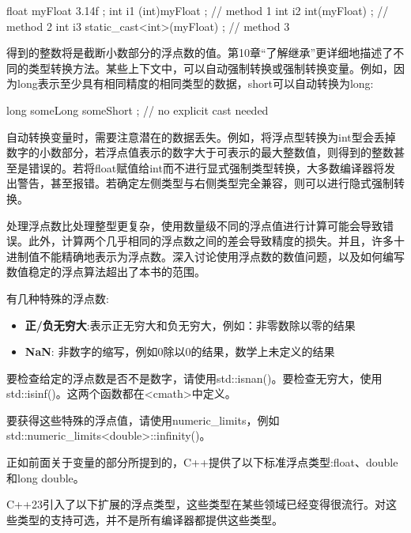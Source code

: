 \begin{cpp}
float myFloat { 3.14f };
int i1 { (int)myFloat }; // method 1
int i2 { int(myFloat) }; // method 2
int i3 { static_cast<int>(myFloat) }; // method 3
\end{cpp}

得到的整数将是截断小数部分的浮点数的值。第10章“了解继承”更详细地描述了不同的类型转换方法。某些上下文中，可以自动强制转换或强制转换变量。例如，因为long表示至少具有相同精度的相同类型的数据，short可以自动转换为long:

\begin{cpp}
long someLong { someShort }; // no explicit cast needed
\end{cpp}

自动转换变量时，需要注意潜在的数据丢失。例如，将浮点型转换为int型会丢掉数字的小数部分，若浮点值表示的数字大于可表示的最大整数值，则得到的整数甚至是错误的。若将float赋值给int而不进行显式强制类型转换，大多数编译器将发出警告，甚至报错。若确定左侧类型与右侧类型完全兼容，则可以进行隐式强制转换。


处理浮点数比处理整型更复杂，使用数量级不同的浮点值进行计算可能会导致错误。此外，计算两个几乎相同的浮点数之间的差会导致精度的损失。并且，许多十进制值不能精确地表示为浮点数。深入讨论使用浮点数的数值问题，以及如何编写数值稳定的浮点算法超出了本书的范围。

有几种特殊的浮点数:

\begin{itemize}
\item
\textbf{正/负无穷大}:表示正无穷大和负无穷大，例如：非零数除以零的结果

\item
\textbf{NaN}: 非数字的缩写，例如0除以0的结果，数学上未定义的结果
\end{itemize}

要检查给定的浮点数是否不是数字，请使用std::isnan()。要检查无穷大，使用std::isinf()。这两个函数都在<cmath>中定义。

要获得这些特殊的浮点值，请使用numeric\_limits，例如std::numeric\_limits<double>::infinity()。



正如前面关于变量的部分所提到的，C++提供了以下标准浮点类型:float、double和long double。

C++23引入了以下扩展的浮点类型，这些类型在某些领域已经变得很流行。对这些类型的支持可选，并不是所有编译器都提供这些类型。

